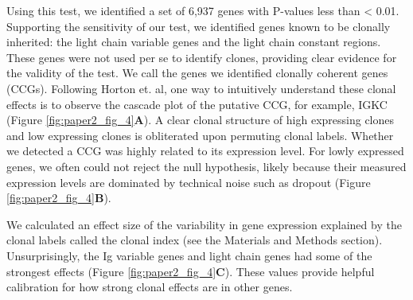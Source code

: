 Using this test, we identified a set of 6,937 genes with P-values less than < 0.01. Supporting the sensitivity of our test, we identified genes known to be clonally inherited: the light chain variable genes and the light chain constant regions. These genes were not used per se to identify clones, providing clear evidence for the validity of the test. We call the genes we identified clonally coherent genes (CCGs). Following Horton et. al\cite{horton_multiplexed_2018}, one way to intuitively understand these clonal effects is to observe the cascade plot of the putative CCG, for example, IGKC  (Figure \ref{fig:paper2_fig_4}\textbf{A}). A clear clonal structure of high expressing clones and low expressing clones is obliterated upon permuting clonal labels. Whether we detected a CCG was highly related to its expression level. For lowly expressed genes, we often could not reject the null hypothesis, likely because their measured expression levels are dominated by technical noise such as dropout (Figure \ref{fig:paper2_fig_4}\textbf{B}).

We calculated an effect size of the variability in gene expression explained by the clonal labels called the clonal index (see the Materials and Methods section). Unsurprisingly, the Ig variable genes and light chain genes had some of the strongest effects (Figure \ref{fig:paper2_fig_4}\textbf{C}). These values provide helpful calibration for how strong clonal effects are in other genes.

